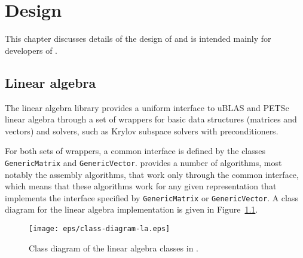 \chapter{Design}

This chapter discusses details of the design of \dolfin{} and is
intended mainly for developers of \dolfin{}.

\section{Linear algebra}

The linear algebra library provides a uniform interface to uBLAS
and PETSc linear algebra through a set of wrappers for basic data
structures (matrices and vectors) and solvers, such as Krylov subspace
solvers with preconditioners.

For both sets of wrappers, a common interface is defined by the
classes \texttt{GenericMatrix} and \texttt{GenericVector}. \dolfin{}
provides a number of algorithms, most notably the assembly algorithms,
that work only through the common interface, which means that these
algorithms work for any given representation that implements the
interface specified by \texttt{GenericMatrix} or
\texttt{GenericVector}. A class diagram for the \dolfin{} linear
algebra implementation is given in Figure~\ref{fig:laclasses}.

\begin{figure}[htbp]
  \begin{center}
    \texttt{[image: eps/class-diagram-la.eps]}
    \caption{Class diagram of the linear algebra classes in \dolfin{}.}
    \label{fig:laclasses}
  \end{center}
\end{figure}

